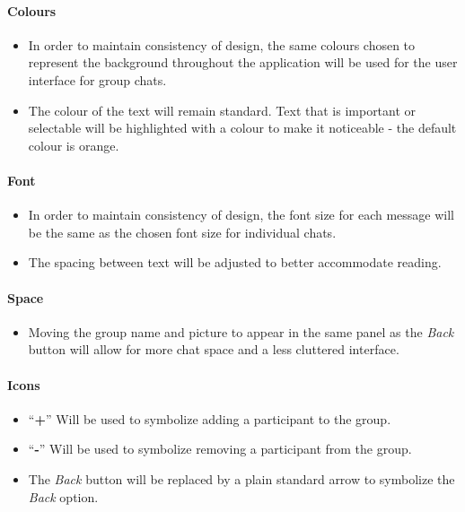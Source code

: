 \documentclass[11pt]{article}
\begin{document}
\paragraph{Colours}
\begin{itemize}
\item	In order to maintain consistency of design, the same colours chosen to represent the background throughout the application will be used for the user interface for group chats.
\item	The colour of the text will remain standard. Text that is important or selectable will be highlighted with a colour to make it noticeable - the default colour is orange. 	\\
\end{itemize}

\paragraph{Font}
\begin{itemize}
\item	In order to maintain consistency of design, the font size for each message will be the same as the chosen font size for individual chats.
\item The spacing between text will be adjusted to better accommodate reading.\\
\end{itemize}

\paragraph{Space}
\begin{itemize}
\item	Moving the group name and picture to appear in the same panel as the \textit{Back} button will allow for more chat space and a less cluttered interface.
\end{itemize}

\paragraph{Icons}
\begin{itemize}
\item	\enquote{\textbf{+}} Will be used to symbolize adding a participant to the group.  
\item \enquote{\textbf{-}} Will be used to symbolize removing a participant from the group.
\item The \textit{Back} button will be replaced by a plain standard arrow to symbolize the \textit{Back} option.  
\end{itemize}
\end{document}
